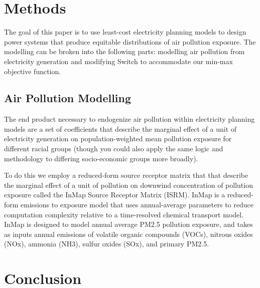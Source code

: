\documentclass[a4paper]{article}
\theoremstyle{definition}
\theoremstyle{plain}
\begin{document}
\section{Methods}

The goal of this paper is to use least-cost electricity planning models to design power systems that produce equitable distributions of air pollution exposure.  The modelling can be broken into the following parts: modelling air pollution from electricity generation and modifying Switch to accommodate our min-max objective function.

\subsection{Air Pollution Modelling}
The end product necessary to endogenize air pollution within electricity planning models are a set of coefficients that describe the marginal effect of a unit of electricity generation on population-weighted mean pollution exposure for different racial groups (though you could also apply the same logic and methodology to differing socio-economic groups more broadly).  

To do this we employ a reduced-form source receptor matrix that that describe the marginal effect of a unit of pollution on downwind concentration of pollution exposure called the InMap Source Receptor Matrix (ISRM).  InMap is a reduced-form emissions to exposure model that uses annual-average parameters to reduce computation complexity relative to a time-resolved chemical transport model. InMap is designed to model annual average PM2.5 pollution exposure, and takes as inputs annual emissions of volatile organic compounds (VOCs), nitrous oxides (NOx), ammonia (NH3), sulfur oxides (SOx), and primary PM2.5.

\section{Conclusion}


\begin{singlespace}
\newpage

%

\end{singlespace}
\end{document}
